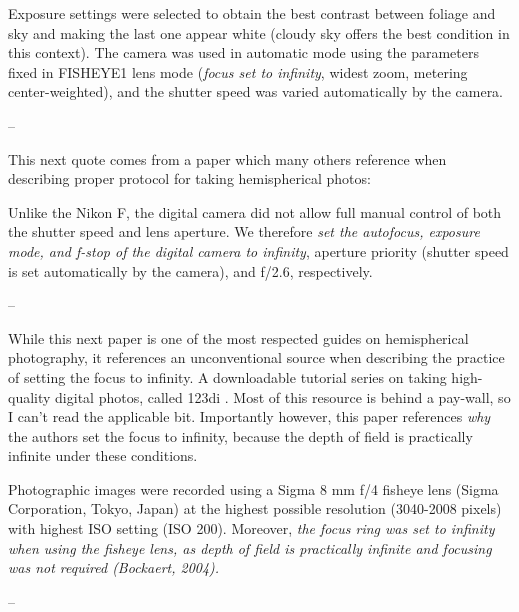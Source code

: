 \documentclass[11pt,a4paper]{article}
\begin{document}
\begin{minipage}{\linewidth}
\begin{framed}
Exposure settings were selected to obtain the best contrast between foliage and sky and making the last one appear white (cloudy sky offers the best condition in this context). The camera was used in automatic mode using the parameters fixed in FISHEYE1 lens mode (\textit{focus set to infinity}, widest zoom, metering center-weighted), and the shutter speed was varied automatically by the camera.

-- \citealt{Paletto2009}
\end{framed}
\end{minipage}

This next quote comes from a paper which many others reference when describing proper protocol for taking hemispherical photos: 

\begin{minipage}{\linewidth}
\begin{framed}
Unlike the Nikon F, the digital camera did not allow full manual control of both the shutter speed and lens aperture. We therefore \textit{set the autofocus, exposure mode, and f-stop of the digital camera to infinity}, aperture priority (shutter speed is set automatically by the camera), and f/2.6, respectively. 

-- \citealt{Frazer2001}
\end{framed}
\end{minipage}

While this next paper is one of the most respected guides on hemispherical photography, it references an unconventional source when describing the practice of setting the focus to infinity. A downloadable tutorial series on taking high-quality digital photos, called 123di \citep{123di}. Most of this resource is behind a pay-wall, so I can't read the applicable bit. Importantly however, this paper references \textit{why} the authors set the focus to infinity, because the depth of field is practically infinite under these conditions.

\begin{minipage}{\linewidth}
\begin{framed}
Photographic images were recorded using a Sigma 8 mm f/4 fisheye lens (Sigma Corporation, Tokyo, Japan) at the highest possible resolution (3040-2008 pixels) with highest ISO setting (ISO 200). Moreover, \textit{the focus ring was set to infinity when using the fisheye lens, as depth of field is practically infinite and focusing was not required (Bockaert, 2004).}

-- \citealt{Jonckheere2005}
\end{framed}
\end{minipage}
\end{document}
